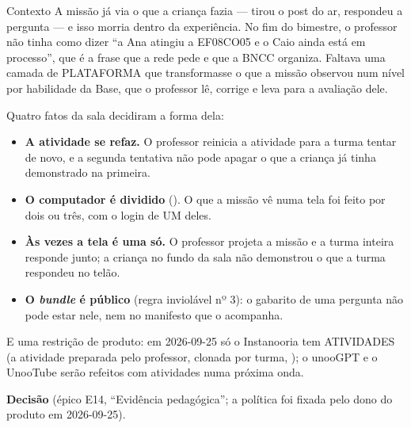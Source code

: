 \begin{especificacao}{Contexto}
A missão já via o que a criança fazia --- tirou o post do ar, respondeu a
pergunta --- e isso morria dentro da experiência. No fim do bimestre, o
professor não tinha como dizer \enquote{a Ana atingiu a EF08CO05 e o Caio ainda
está em processo}, que é a frase que a rede pede e que a BNCC organiza. Faltava
uma camada de PLATAFORMA que transformasse o que a missão observou num nível por
habilidade da Base, que o professor lê, corrige e leva para a avaliação dele.

Quatro fatos da sala decidiram a forma dela:

\begin{itemize}
  \item \textbf{A atividade se refaz.} O professor reinicia a atividade para a
    turma tentar de novo, e a segunda tentativa não pode apagar o que a criança
    já tinha demonstrado na primeira.
  \item \textbf{O computador é dividido} (). O que a missão vê
    numa tela foi feito por dois ou três, com o login de UM deles.
  \item \textbf{Às vezes a tela é uma só.} O professor projeta a missão e a
    turma inteira responde junto; a criança no fundo da sala não demonstrou o que
    a turma respondeu no telão.
  \item \textbf{O \emph{bundle} é público} (regra inviolável nº 3): o gabarito
    de uma pergunta não pode estar nele, nem no manifesto que o acompanha.
\end{itemize}

E uma restrição de produto: em 2026-09-25 só o Instanooria tem ATIVIDADES (a
atividade preparada pelo professor, clonada por turma, ); o unooGPT
e o UnooTube serão refeitos com atividades numa próxima onda.
\end{especificacao}

\textbf{Decisão} (épico E14, \enquote{Evidência pedagógica}; a política foi
fixada pelo dono do produto em 2026-09-25).

